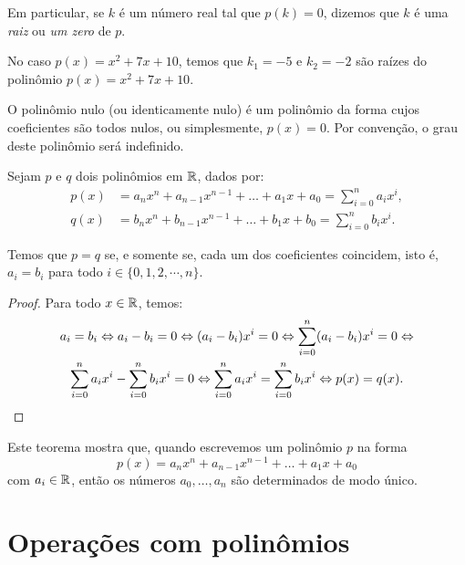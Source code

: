  \begin{obs}
 Em particular, se $k$ é um número real tal que $p(k)= 0$, dizemos que $k$ é uma \emph{raiz} ou \emph{um zero} de $p$.
 \end{obs}

 \begin{exem}
 No caso $p(x)= x^2 + 7x+10$, temos que $k_1= -5$ e $k_2=-2$ são raízes do polinômio $p(x)= x^2 + 7x+10$.
 \end{exem}

  \begin{obs}
  O polinômio nulo (ou identicamente nulo) é um polinômio da forma cujos coeficientes são todos nulos, ou simplesmente, $p(x)= 0$. Por convenção, o grau deste polinômio será indefinido.
 \end{obs}


\begin{teo}
  Sejam $p$ e $q$ dois polinômios em $\mathbb{R}$, dados por:
\begin{align*}
p(x)&= a_nx^n + a_{n-1}x^{n-1}+ \ldots + a_1x+ a_0= \sum_{i=0}^{n} a_ix^i,\\
q(x)&= b_nx^n + b_{n-1}x^{n-1}+ \ldots + b_1x+ b_0= \sum_{i=0}^{n} b_ix^i.
\end{align*}
  
  Temos que $p=q$ se, e somente se, cada um dos coeficientes coincidem, isto é, $a_i= b_i$ para todo $i \in \{0, 1, 2, \cdots, n\}$.
 \end{teo}
 \begin{proof}
 Para todo $x \in \mathbb{R}$, temos:
\begin{gather*}
a_i= b_i \Leftrightarrow a_i - b_i=0 \Leftrightarrow (a_i - b_i)x^i=0 \Leftrightarrow \sum_{i=0}^{n}(a_i - b_i)x^i= 0 \Leftrightarrow\\
 \sum_{i=0}^{n}a_i x^i - \sum_{i=0}^{n}b_i x^i = 0 \Leftrightarrow \sum_{i=0}^{n}a_i x^i = \sum_{i=0}^{n}b_i x^i \Leftrightarrow p(x)= q(x).\qedhere
\end{gather*}
 \end{proof}

  Este teorema mostra que, quando escrevemos um polinômio $p$ na forma
\begin{equation*}
p(x)= a_nx^n + a_{n-1}x^{n-1}+ \ldots + a_1x+ a_0
\end{equation*}
 com $a_i \in \mathbb{R}$, então os números $a_0, \ldots, a_n$ são determinados de modo único.

\section{Operações com polinômios}

